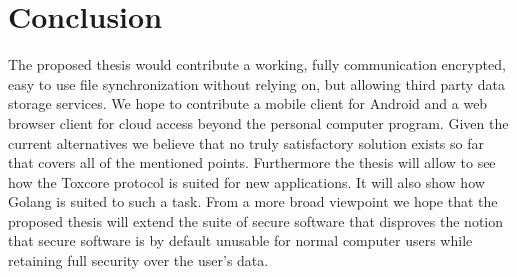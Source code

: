 \documentclass[a4paper,10pt,twoside]{article}
\begin{document}
\section{Conclusion}

The proposed thesis would contribute a working, fully communication encrypted, easy to use file synchronization without relying on, but allowing third party data storage services.
We hope to contribute a mobile client for Android and a web browser client for cloud access beyond the personal computer program.
Given the current alternatives we believe that no truly satisfactory solution exists so far that covers all of the mentioned points.
Furthermore the thesis will allow to see how the Toxcore protocol is suited for new applications.
It will also show how Golang is suited to such a task.
From a more broad viewpoint we hope that the proposed thesis will extend the suite of secure software that disproves the notion that secure software is by default unusable for normal computer users while retaining full security over the user's data.

{\small %

}
\end{document}
